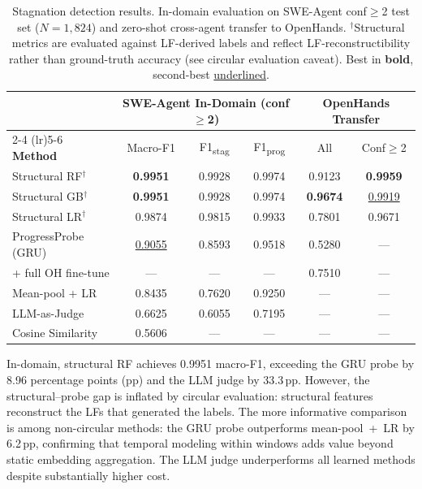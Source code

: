 \begin{table}[t]
\centering
\small
\begin{tabular}{l ccc cc}
\toprule
& \multicolumn{3}{c}{\textbf{SWE-Agent In-Domain} (conf${\geq}$2)} & \multicolumn{2}{c}{\textbf{OpenHands Transfer}} \\
\cmidrule(lr){2-4} \cmidrule(lr){5-6}
\textbf{Method} & Macro-F1 & F1\textsubscript{stag} & F1\textsubscript{prog} & All & Conf${\geq}$2 \\
\midrule
Structural RF$^\dagger$       & \textbf{0.9951} & 0.9928 & 0.9974 & 0.9123 & \textbf{0.9959} \\
Structural GB$^\dagger$       & \textbf{0.9951} & 0.9928 & 0.9974 & \textbf{0.9674} & \underline{0.9919} \\
Structural LR$^\dagger$       & 0.9874 & 0.9815 & 0.9933 & 0.7801 & 0.9671 \\
ProgressProbe (GRU)           & \underline{0.9055} & 0.8593 & 0.9518 & 0.5280 & --- \\
\quad + full OH fine-tune      & ---    & ---    & ---    & 0.7510 & --- \\
Mean-pool + LR                & 0.8435 & 0.7620 & 0.9250 & ---    & --- \\
LLM-as-Judge                  & 0.6625 & 0.6055 & 0.7195 & ---    & --- \\
Cosine Similarity             & 0.5606 & ---    & ---    & ---    & --- \\
\bottomrule
\end{tabular}
\caption{Stagnation detection results. In-domain evaluation on SWE-Agent conf${\geq}$2 test set ($N{=}1{,}824$) and zero-shot cross-agent transfer to OpenHands. $^\dagger$Structural metrics are evaluated against LF-derived labels and reflect LF-reconstructibility rather than ground-truth accuracy (see circular evaluation caveat). Best in \textbf{bold}, second-best \underline{underlined}.}
\label{tab:main_results}
\end{table}

In-domain, structural RF achieves 0.9951 macro-F1, exceeding the GRU probe by 8.96 percentage points (pp) and the LLM judge by 33.3\,pp.
However, the structural--probe gap is inflated by circular evaluation: structural features reconstruct the LFs that generated the labels.
The more informative comparison is among non-circular methods: the GRU probe outperforms mean-pool~+~LR by 6.2\,pp, confirming that temporal modeling within windows adds value beyond static embedding aggregation.
The LLM judge underperforms all learned methods despite substantially higher cost.

